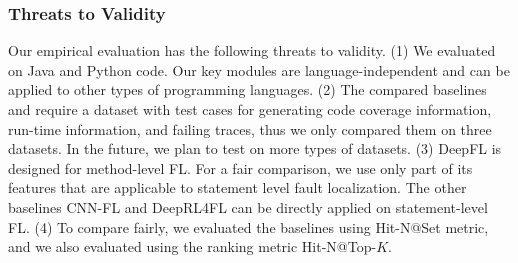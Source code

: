 \subsubsection{Threats to Validity}
Our empirical evaluation has the following threats to validity. (1) We
evaluated {\tool} on Java and Python code. Our key modules are
language-independent and can be applied to other types of programming
languages.  (2) The compared baselines and {\tool} require a dataset
with test cases for generating code coverage information, run-time
information, and failing traces, thus we only compared them on three
datasets. In the future, we plan to test {\tool} on more types of
datasets. (3) DeepFL is designed for method-level FL. For a fair
comparison, we use only part of its features that are applicable to
statement level fault localization. The other baselines CNN-FL and
DeepRL4FL can be directly applied on statement-level FL. (4) To
compare fairly, we evaluated the baselines using Hit-N@Set
metric, and we also evaluated {\tool} using the ranking metric
Hit-N@Top-$K$.



